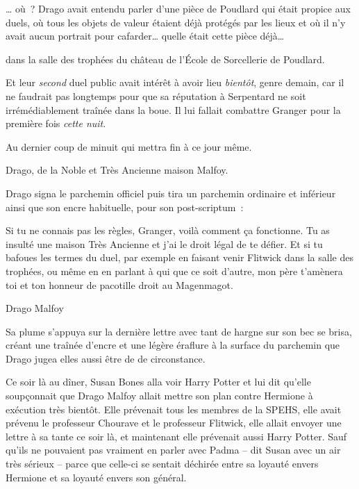 … où~? Drago avait entendu parler d'une pièce de Poudlard qui était propice aux duels, où tous les objets de valeur étaient déjà protégés par les lieux et où il n'y avait aucun portrait pour cafarder… quelle était cette pièce déjà…

\begin{writtenNote}
dans la salle des trophées du château de l'École de Sorcellerie de Poudlard. \end{writtenNote}

Et leur \emph{second} duel public avait intérêt à avoir lieu \emph{bientôt}, genre demain, car il ne faudrait pas longtemps pour que sa réputation à Serpentard ne soit irrémédiablement traînée dans la boue. Il lui fallait combattre Granger pour la première fois \emph{cette nuit}.

\begin{writtenNote}
Au dernier coup de minuit qui mettra fin à ce jour même.

Drago, de la Noble et Très Ancienne maison Malfoy.
\end{writtenNote}

Drago signa le parchemin officiel puis tira un parchemin ordinaire et inférieur ainsi que son encre habituelle, pour son post-scriptum~:

\begin{writtenNote}Si tu ne connais pas les règles, Granger, voilà comment ça fonctionne. Tu as insulté une maison Très Ancienne et j'ai le droit légal de te défier. Et si tu bafoues les termes du duel, par exemple en faisant venir Flitwick dans la salle des trophées, ou même en en parlant à qui que ce soit d'autre, mon père t'amènera toi et ton honneur de pacotille droit au Magenmagot.

Drago Malfoy
\end{writtenNote}

Sa plume s'appuya sur la dernière lettre avec tant de hargne sur son bec se brisa, créant une traînée d'encre et une légère éraflure à la surface du parchemin que Drago jugea elles aussi être de de circonstance.

\later

Ce soir là au dîner, Susan Bones alla voir Harry Potter et lui dit qu'elle soupçonnait que Drago Malfoy allait mettre son plan contre Hermione à exécution très bientôt. Elle prévenait tous les membres de la SPEHS, elle avait prévenu le professeur Chourave et le professeur Flitwick, elle allait envoyer une lettre à sa tante ce soir là, et maintenant elle prévenait aussi Harry Potter. Sauf qu'ils ne pouvaient pas vraiment en parler avec Padma -- dit Susan avec un air très sérieux -- parce que celle-ci se sentait déchirée entre sa loyauté envers Hermione et sa loyauté envers son général.

